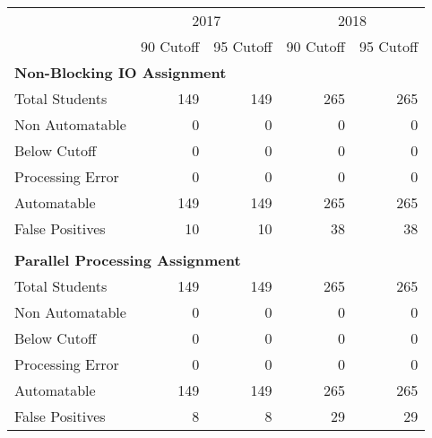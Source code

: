 \begin{tabular}{lrrrr} \toprule
& \multicolumn{2}{c}{2017} & \multicolumn{2}{c}{2018} \\
& 90 Cutoff & 95 Cutoff & 90 Cutoff & 95 Cutoff \\
\midrule
\multicolumn{5}{l}{ \textbf{Non-Blocking IO Assignment} }\\
\tspace Total Students           &   149 &   149 &   265 &   265 \\
\tspace Non Automatable          &     0 &     0 &     0 &     0 \\
\tspace \tspace Below Cutoff     &     0 &     0 &     0 &     0 \\
\tspace \tspace Processing Error &     0 &     0 &     0 &     0 \\
\tspace Automatable              &   149 &   149 &   265 &   265 \\
\tspace \tspace False Positives  &    10 &    10 &    38 &    38 \\
\\
\multicolumn{5}{l}{ \textbf{Parallel Processing Assignment} }\\
\tspace Total Students           &   149 &   149 &   265 &   265 \\
\tspace Non Automatable          &     0 &     0 &     0 &     0 \\
\tspace \tspace Below Cutoff     &     0 &     0 &     0 &     0 \\
\tspace \tspace Processing Error &     0 &     0 &     0 &     0 \\
\tspace Automatable              &   149 &   149 &   265 &   265 \\
\tspace \tspace False Positives  &     8 &     8 &    29 &    29 \\
\bottomrule
\end{tabular}
